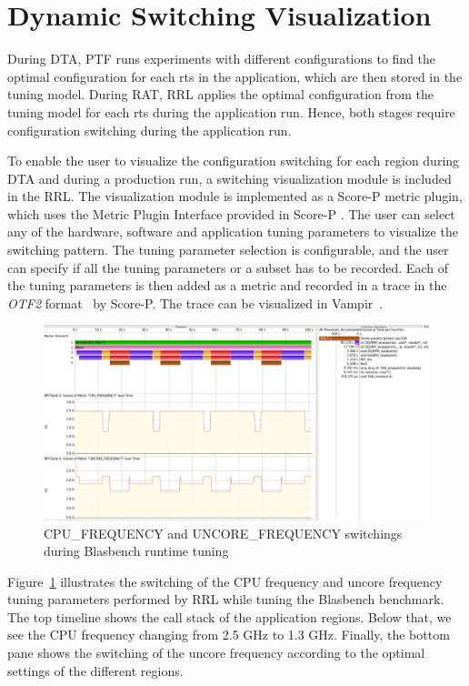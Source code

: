 \section{Dynamic Switching Visualization} \label{switching-visualization}
During DTA, PTF runs experiments with different configurations to find the optimal configuration for each rts in the application, which are then stored in the tuning model. During RAT, RRL applies the optimal configuration from the tuning model for each rts during the application run. Hence, both stages require configuration switching during the application run.

To enable the user to visualize the configuration switching for each region during DTA and during a production run, a switching visualization module is included in the RRL. 
The visualization module is implemented as a Score-P metric plugin, which uses the Metric Plugin Interface provided in Score-P \cite{Schoene2017}. The user can select any of the hardware, software and application tuning parameters to visualize the switching pattern. The tuning parameter selection is configurable, and the user can specify if all the tuning parameters or a subset has to be recorded. Each of the tuning parameters is then added as a metric and recorded in a trace in the \textit{OTF2} format~\cite{Ilsche-Cstate} by Score-P. The trace can be visualized in Vampir~\cite{BHJR:10:VampirOverview}. 

\begin{figure}[!t]
	\centering
	\includegraphics[width=.97\columnwidth]{figures/visualization_trace.png}
	\caption{{CPU\_FREQUENCY} and {UNCORE\_FREQUENCY} switchings during Blasbench runtime tuning}
	\label{fig:switch_visualization}
\end{figure}
 
Figure~\ref{fig:switch_visualization} illustrates the switching of the CPU frequency and uncore frequency tuning parameters performed by RRL while tuning the Blasbench benchmark. The top timeline shows the call stack of the application regions. Below that, we see the CPU frequency changing from 2.5 GHz to 1.3 GHz. Finally, the bottom pane shows the switching of the uncore frequency according to the optimal settings of the different regions.
\newpage

 